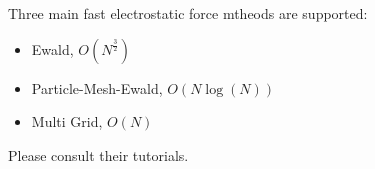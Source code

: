 \documentclass[11pt]{article}
\begin{document}
Three main fast electrostatic force mtheods are supported:
\begin{itemize}
\item Ewald, $O(N^{\frac{3}{2}})$
\item Particle-Mesh-Ewald, $O(N\log(N))$
\item Multi Grid, $O(N)$
\end{itemize}

Please consult their tutorials.

\end{document}
